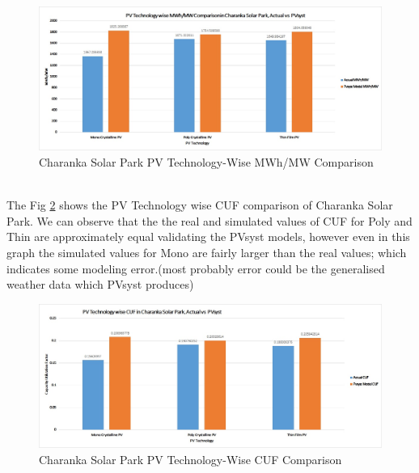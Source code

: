 \begin{figure}[H]
\centering
\includegraphics[scale=0.5]{Charanka1}
\caption{Charanka Solar Park PV Technology-Wise MWh/MW Comparison}
\label{figc2h8} %
\end{figure}
\\
The Fig \ref{figc2h9} shows the PV Technology wise CUF comparison of Charanka Solar Park. We can observe that the the real and simulated values of CUF for Poly and Thin are approximately equal validating the PVsyst models, however even in this graph the simulated values for Mono are fairly larger than the real values; which indicates some modeling error.(most probably error could be the generalised weather data which PVsyst produces) 
\\
\begin{figure}[H]
\centering
\includegraphics[scale=0.5]{Charanka3}
\caption{Charanka Solar Park PV Technology-Wise CUF Comparison}
\label{figc2h9} %
\end{figure}

